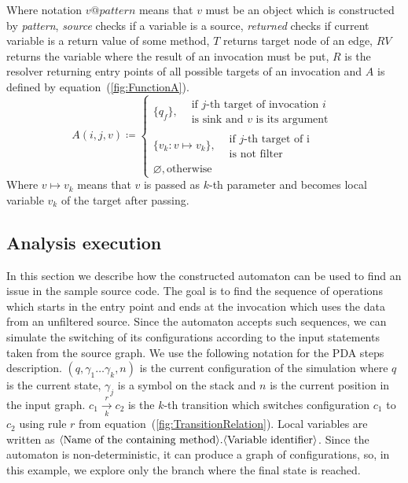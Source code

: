 Where notation $v@\textit{pattern}$ means that $v$ must be an object which is constructed by \textit{pattern}, \textit{source} checks if a variable is a source, \textit{returned} checks if current variable is a return value of some method, $T$ returns target node of an edge, $RV$ returns the variable where the result of an invocation must be put, $R$ is the resolver returning entry points of all possible targets of an invocation and $A$ is defined by equation~(\ref{fig:FunctionA}).
\begin{equation}
	\label{fig:FunctionA}
	A(i, j, v) \coloneqq
	\begin{cases}
		\{q_f\},  \begin{split}&\textrm{if $j$-th target of invocation $i$} \\ & \textrm{is sink and $v$ is its argument}\end{split} \\
			\{v_k: v \mapsto v_k\}, \begin{split}&\textrm{if $j$-th target of i} \\ & \textrm{is not filter}\end{split} \\
		\varnothing, \textrm{otherwise}
	\end{cases}
\end{equation}
Where $v \mapsto v_k$ means that $v$ is passed as $k$-th parameter and becomes local variable $v_k$ of the target after passing.

\subsection{Analysis execution}

In this section we describe how the constructed automaton can be used to find an issue in the sample source code.
The goal is to find the sequence of operations which starts in the entry point and ends at the invocation which uses the data from an unfiltered source.
Since the automaton accepts such sequences, we can simulate the switching of its configurations according to the input statements taken from the source graph.
We use the following notation for the PDA steps description.
$(q, \gamma_1 \ldots \gamma_k, n)$ is the current configuration of the simulation where $q$ is the current state, $\gamma_j$ is a symbol on the stack and $n$ is the current position in the input graph.
$c_1 \xrightarrow[k]{r} c_2$ is the $k$-th transition which switches configuration $c_1$ to $c_2$ using rule $r$ from equation~(\ref{fig:TransitionRelation}).
Local variables are written as $\text{\textlangle{}Name of the containing method\textrangle{}}.\text{\textlangle{}Variable identifier\textrangle{}}$.
Since the automaton is non-deterministic, it can produce a graph of configurations, so, in this example, we explore only the branch where the final state is reached.

